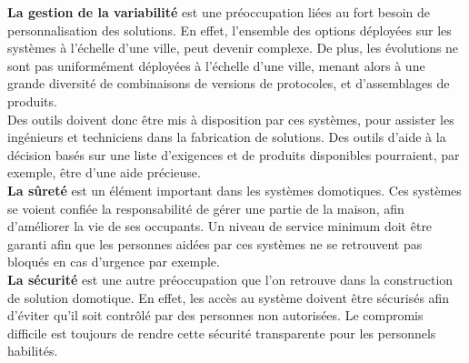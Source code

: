 {\bf La gestion de la variabilité} est une préoccupation liées au fort besoin de personnalisation des solutions. En effet, l'ensemble des options déployées sur les systèmes à l'échelle d'une ville, peut devenir complexe. De plus, les évolutions ne sont pas uniformément déployées à l'échelle d'une ville, menant alors à une grande diversité de combinaisons de versions de protocoles, et d'assemblages de produits.\\
Des outils doivent donc être mis à disposition par ces systèmes, pour assister les ingénieurs et techniciens dans la fabrication de solutions. Des outils d'aide à la décision basés sur une liste d'exigences et de produits disponibles pourraient, par exemple, être d'une aide précieuse.\\










{\bf La sûreté} est un élément important dans les systèmes domotiques. Ces systèmes se voient confiée la responsabilité de gérer une partie de la maison, afin d'améliorer la vie de ses occupants. Un niveau de service minimum doit être garanti afin que les personnes aidées par ces systèmes ne se retrouvent pas bloqués en cas d'urgence par exemple. \\

{\bf La sécurité} est une autre préoccupation que l'on retrouve dans la construction de solution domotique. En effet, les accès au système doivent être sécurisés afin d'éviter qu'il soit contrôlé par des personnes non autorisées. Le compromis difficile est toujours de rendre cette sécurité transparente pour les personnels habilités.\\


